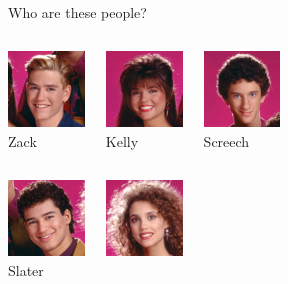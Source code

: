 \documentclass{beamer}\usepackage[]{graphicx}\usepackage[]{color}
\begin{document}
\begin{darkframes}
    \begin{frame}{Who are these people?}
      \begin{columns}[onlytextwidth]
          \begin{center}
            \includegraphics[width=0.8in]{zack} \\
            Zack
          \end{center}
          \begin{center}
            \includegraphics[width=0.8in]{kelly} \\
            Kelly
          \end{center}
          \begin{center}
            \includegraphics[width=0.8in]{screech} \\
            Screech
          \end{center}
      \end{columns}
      \smallskip
      \begin{columns}[onlytextwidth]
          \begin{center}
            \includegraphics[width=0.8in]{slater} \\
            Slater
          \end{center}
          \begin{center}
            \includegraphics[width=0.8in]{jessie} \\

\end{center}
\end{columns}
\end{frame}
\end{darkframes}
\end{document}
